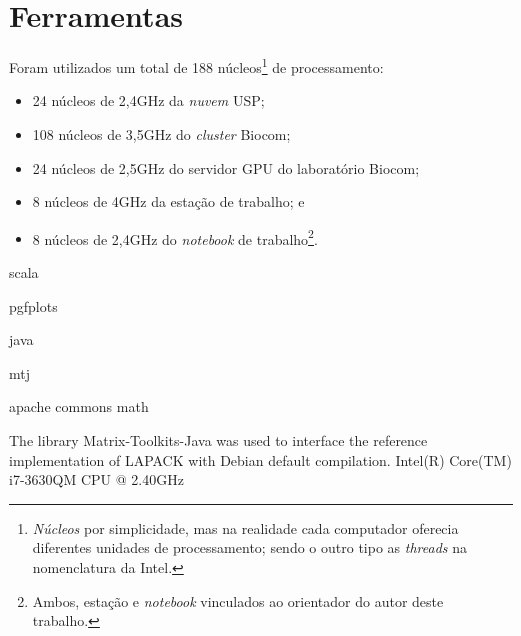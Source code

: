 \section{Ferramentas}\label{sec:ferramentas}
Foram utilizados um total de 188 núcleos\footnote{\textit{Núcleos} por simplicidade,
mas na realidade cada computador oferecia diferentes unidades de processamento;
sendo o outro tipo as \textit{threads} na nomenclatura da Intel.} de processamento:
\begin{itemize}
\item 24 núcleos de 2,4GHz da \textit{nuvem} USP;
\item 108 núcleos de 3,5GHz do \textit{cluster} Biocom;
\item 24 núcleos de 2,5GHz do servidor GPU do laboratório Biocom;
\item 8 núcleos de 4GHz da estação de trabalho; e
\item 8 núcleos de 2,4GHz do \textit{notebook} de trabalho\footnote{Ambos,
estação e \textit{notebook} vinculados ao orientador do autor deste trabalho.}.
\end{itemize}


scala

pgfplots

java

mtj

apache commons math

The library Matrix-Toolkits-Java was used to  interface the reference implementation of LAPACK with Debian default compilation.
Intel(R) Core(TM) i7-3630QM CPU @ 2.40GHz